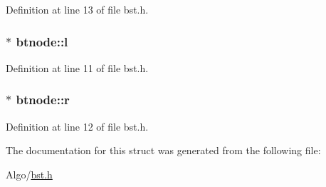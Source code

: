 Definition at line 13 of file bst.\-h.

\hypertarget{structbtnode_af6ef69a154018945fa5e1a5287dfc4e0}{
\subsubsection[{l}]{$\ast$ btnode\-::l}}\label{structbtnode_af6ef69a154018945fa5e1a5287dfc4e0}


Definition at line 11 of file bst.\-h.

\hypertarget{structbtnode_aad4b4a959992763c35c51f313c698002}{
\subsubsection[{r}]{$\ast$ btnode\-::r}}\label{structbtnode_aad4b4a959992763c35c51f313c698002}


Definition at line 12 of file bst.\-h.



The documentation for this struct was generated from the following file\-:\begin{DoxyCompactItemize}
\item 
Algo/\hyperlink{bst_8h}{bst.\-h}\end{DoxyCompactItemize}
